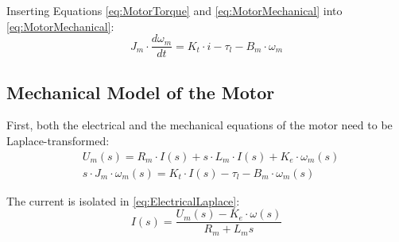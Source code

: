 Inserting Equations \eqref{eq:MotorTorque} and \eqref{eq:MotorMechanical} into \autoref{eq:MotorMechanical}:
\begin{equation}
	J_{m} \cdot \frac{d\omega_{m}}{dt} = K_{t} \cdot i - \tau_{l} - B_{m} \cdot \omega_{m}
\end{equation}

\subsection*{Mechanical Model of the Motor}
First, both the electrical and the mechanical equations of the motor need to be Laplace-transformed:
\begin{subequations}
	\begin{flalign}
		&U_{m}(s) = R_{m} \cdot I(s) + s \cdot L_{m} \cdot I(s) + K_{e} \cdot \omega_{m}(s) \label{eq:ElectricalLaplace}\\	
		&s\cdot J_{m} \cdot \omega_{m}(s) = K_{t} \cdot I(s) - \tau_{l} - B_{m} \cdot \omega_{m}(s)	\label{eq:MechanicalLaplace}
	\end{flalign}
\end{subequations}

The current is isolated in \autoref{eq:ElectricalLaplace}:
\begin{equation}
	I(s)=\frac{U_m(s)-K_e\cdot\omega(s)}{R_m+L_m s}
\end{equation}












